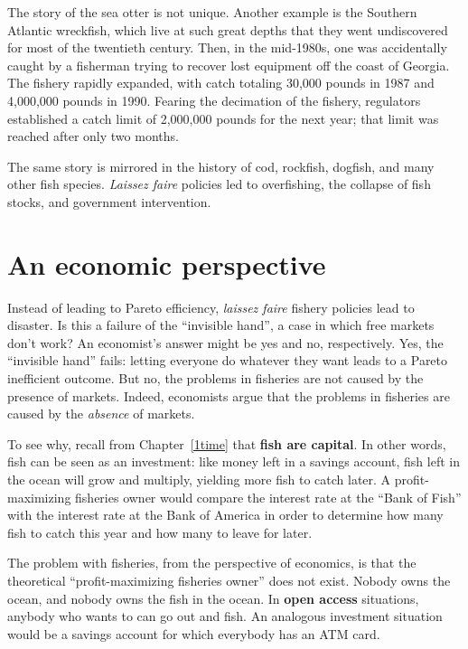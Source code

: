 The story of the sea otter is not unique. Another example is the Southern Atlantic wreckfish, which live at such great depths that they went undiscovered for most of the twentieth century. Then, in the mid-1980s, one was accidentally caught by a fisherman trying to recover lost equipment off the coast of Georgia. The fishery rapidly expanded, with catch totaling 30,000 pounds in 1987 and 4,000,000 pounds in 1990. Fearing the decimation of the fishery, regulators established a catch limit of 2,000,000 pounds for the next year; that limit was reached after only two months.

The same story is mirrored in the history of cod, rockfish, dogfish, and many other fish species. \emph{Laissez faire} policies led to overfishing, the collapse of fish stocks, and government intervention.

\section{An economic perspective}

Instead of leading to Pareto efficiency, \emph{laissez faire} fishery   policies lead to disaster. Is this a failure of the ``invisible hand'', a case in which free markets don't work? An economist's answer might be yes and no, respectively. Yes, the ``invisible hand'' fails: letting everyone do whatever they want leads to a Pareto inefficient outcome. But no, the problems in fisheries are not caused by the presence of markets. Indeed, economists argue that the problems in fisheries are caused by the \emph{absence} of markets.

To see why, recall from Chapter~\ref{1time} that \textbf{fish are capital}. In other words, fish can be seen as an investment: like money left in a savings account, fish left in the ocean will grow and multiply, yielding more fish to catch later. A profit-maximizing fisheries owner would compare the interest rate at the ``Bank of Fish'' with the interest rate at the Bank of America in order to determine how many fish to catch this year and how many to leave for later.

The problem with fisheries, from the perspective of economics, is that the theoretical ``profit-maximizing fisheries owner'' does not exist. Nobody owns the ocean, and nobody owns the fish in the ocean. In \textbf{open access} situations, anybody who wants to can go out and fish. An analogous investment situation would be a savings account for which everybody has an ATM card.


